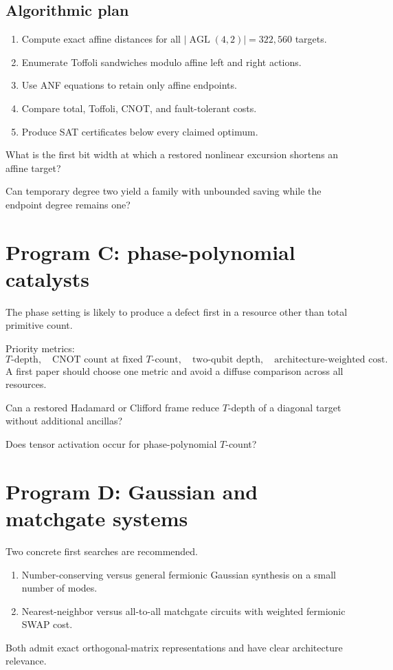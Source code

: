 \subsection{Algorithmic plan}
\begin{enumerate}
\item Compute exact affine distances for all $|\operatorname{AGL}(4,2)|=322{,}560$ targets.
\item Enumerate Toffoli sandwiches modulo affine left and right actions.
\item Use ANF equations to retain only affine endpoints.
\item Compare total, Toffoli, CNOT, and fault-tolerant costs.
\item Produce SAT certificates below every claimed optimum.
\end{enumerate}

\begin{question}
What is the first bit width at which a restored nonlinear excursion shortens an affine target?
\end{question}
\begin{question}
Can temporary degree two yield a family with unbounded saving while the endpoint degree remains one?
\end{question}

\section{Program C: phase-polynomial catalysts}
The phase setting is likely to produce a defect first in a resource other than total primitive count.

Priority metrics:
\[
T\text{-depth},
\quad
\text{CNOT count at fixed }T\text{-count},
\quad
\text{two-qubit depth},
\quad
\text{architecture-weighted cost}.
\]
A first paper should choose one metric and avoid a diffuse comparison across all resources.

\begin{question}
Can a restored Hadamard or Clifford frame reduce $T$-depth of a diagonal target without additional ancillas?
\end{question}
\begin{question}
Does tensor activation occur for phase-polynomial $T$-count?
\end{question}

\section{Program D: Gaussian and matchgate systems}
Two concrete first searches are recommended.
\begin{enumerate}
\item Number-conserving versus general fermionic Gaussian synthesis on a small number of modes.
\item Nearest-neighbor versus all-to-all matchgate circuits with weighted fermionic SWAP cost.
\end{enumerate}
Both admit exact orthogonal-matrix representations and have clear architecture relevance.

